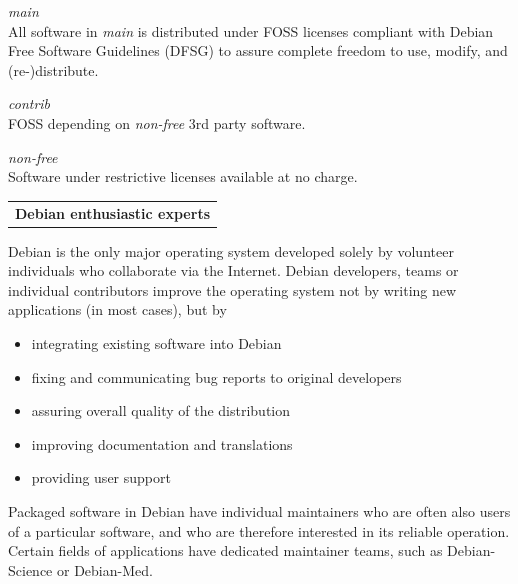 \documentclass[letterpaper,landscape]{report}
\makeatletter
\newenvironment{ndtable}
  {\def\@captype{table}}
  {}
\newcommand{\ndheading}[3]{%
\vspace{0.5em}
\begin{ndtable}%
\rowcolors[\hline]{1}{#2}{} \arrayrulecolor{#3}
\begin{tabularx}{\columnwidth}{>{\centering\arraybackslash}X}\vspace{-.5em}\normalfont\large\bfseries
  #1\vspace{0.05em}\\\end{tabularx}
\end{ndtable}
\vspace{-.5em}
}
\newcommand{\ndsubsection}[1]{\ndheading{#1}{secbgcol}{secfgcol}}
\makeatother
\begin{document}
\begin{multicols}{3}

\begin{description}[nolistsep,leftmargin=1pc,topsep=0em]
\item[Free as in freedom]\hfill\emph{main}\\
  All software in \emph{main} is distributed under FOSS licenses
  compliant with Debian Free Software Guidelines (DFSG) to assure
  complete freedom to use, modify, and (re-)distribute.
\item[Wanna-be free]\hfill\emph{contrib}\\
  FOSS depending on \emph{non-free} 3rd party software.
\item[Somewhat free]\hfill\emph{non-free}\\
  Software under restrictive licenses available at no charge.
\end{description}


\ndsubsection{Debian enthusiastic experts}

Debian is the only major operating system developed
solely by volunteer individuals who collaborate via the Internet.
Debian developers, teams or individual contributors improve the operating
system not by writing new applications (in most cases), but by
\begin{itemize}[nolistsep,topsep=0em,leftmargin=1pc]
\item integrating existing software into Debian
\item fixing and communicating bug reports to original developers
\item assuring overall quality of the distribution
\item improving documentation and translations
\item providing user support
\end{itemize}

Packaged software in Debian have individual maintainers who are
often also users of a particular software, and who are therefore interested in its
reliable operation. Certain fields of applications have dedicated maintainer
teams, such as Debian-Science or Debian-Med.


\end{multicols}
\end{document}

